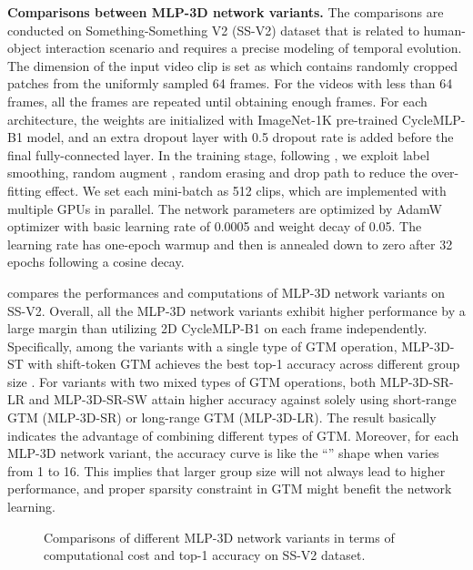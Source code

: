 \documentclass[10pt,twocolumn,letterpaper]{article}
\begin{document}
\textbf{Comparisons between MLP-3D network variants.} The comparisons are conducted on Something-Something V2 (SS-V2) \cite{Goyal2017TheS} dataset that is related to human-object interaction scenario and requires a precise modeling of temporal evolution. The dimension of the input video clip is set as  which contains randomly cropped  patches from the uniformly sampled 64 frames. For the videos with less than 64 frames, all the frames are repeated until obtaining enough frames. For each architecture, the weights are initialized with ImageNet-1K pre-trained CycleMLP-B1 model, and an extra dropout layer with 0.5 dropout rate is added before the final fully-connected layer. In the training stage, following \cite{fan2021multiscale,liu2021video}, we exploit label smoothing, random augment \cite{cubuk2020randaugment}, random erasing \cite{zhong2020random} and drop path \cite{huang2016deep} to reduce the over-fitting effect. We set each mini-batch as 512 clips, which are implemented with multiple GPUs in parallel. The network parameters are optimized by AdamW optimizer with basic learning rate of 0.0005 and weight decay of 0.05. The learning rate has one-epoch warmup and then is annealed down to zero after 32 epochs following a cosine decay.

 compares the performances and computations of MLP-3D network variants on SS-V2. Overall, all the MLP-3D network variants exhibit higher performance by a large margin than utilizing 2D CycleMLP-B1 on each frame independently. Specifically, among the variants with a single type of GTM operation, MLP-3D-ST with shift-token GTM achieves the best top-1 accuracy across different group size . For variants with two mixed types of GTM operations, both MLP-3D-SR-LR and MLP-3D-SR-SW attain higher accuracy against solely using short-range GTM (MLP-3D-SR) or long-range GTM (MLP-3D-LR). The result basically indicates the advantage of combining different types of GTM. Moreover, for each MLP-3D network variant, the accuracy curve is like the ``'' shape when  varies from 1 to 16. This implies that larger group size will not always lead to higher performance, and proper sparsity constraint in GTM might benefit the network learning.

\begin{figure}[!tb]
   \vspace{-0.1in}
   \caption{\small Comparisons of different MLP-3D network variants in terms of computational cost and top-1 accuracy on SS-V2 dataset.}
   \label{fig:com}
   \vspace{-0.2in}
\end{figure}
\end{document}
